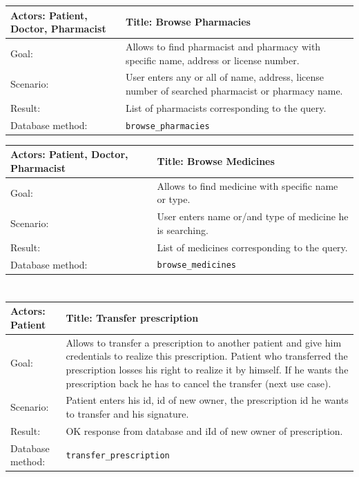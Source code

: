 \begin{longtable}{|p{6cm}|p{7.75cm}|}
    
    \hline
    Actors: Patient, Doctor, Pharmacist &Title: Browse Pharmacies \\ \hline
    Goal: & Allows to find pharmacist and pharmacy with specific name, address or license number. \\ \hline
    Scenario: & User enters any or all of name, address, license number of searched pharmacist or pharmacy name. \\ \hline
    Result: & List of pharmacists corresponding to the query. \\ \hline
    Database  method: & \texttt{browse\_pharmacies} \\ \hline

\end{longtable}


    \begin{longtable}{| p{6cm} | p{7.75cm} |}
    \hline
    Actors: Patient, Doctor, Pharmacist &Title: Browse Medicines \\ \hline
    Goal: & Allows to find medicine with specific name or type. \\ \hline
    Scenario: & User enters name or/and type of medicine he is searching. \\ \hline
    Result: & List of medicines corresponding to the query. \\ \hline
    Database  method: & \texttt{browse\_medicines} \\ \hline
    \end{longtable}

\normalsize

\section{}

\small
    \begin{longtable}{| p{6cm} | p{7.75cm} |}
    \hline
    Actors: Patient &Title: Transfer prescription \\ \hline
    Goal: & Allows to transfer a prescription to another patient and give him credentials to realize this prescription. Patient who transferred the prescription losses his right to realize it by himself. If he wants the prescription back he has to cancel the transfer (next use case). \\ \hline
    Scenario: & Patient enters his id, id of new owner, the prescription id he wants to transfer and his signature. \\ \hline
    Result: & OK response from database and iId of new owner of prescription. \\ \hline
    Database  method: & \texttt{transfer\_prescription} \\ \hline
\end{longtable}

